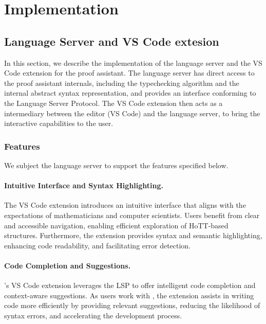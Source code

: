 \chapter{Implementation}
\label{chap:impl}

\section{\Rzk{} Language Server and VS Code extesion}

In this section, we describe the implementation of the language server
and the VS Code extension for the \Rzk{} proof assistant.
The language server has direct access to the proof assistant internals,
including the typechecking algorithm and the internal abstract syntax representation,
and provides an interface conforming to the Language Server Protocol.
The VS Code extension then acts as a intermediary between the editor (VS Code)
and the language server, to bring the interactive capabilities to the user.

\subsection{Features}


We subject the language server to support the features specified below.

\subsubsection{Intuitive Interface and Syntax Highlighting.}

The VS Code extension introduces an intuitive interface that aligns with
the expectations of mathematicians and computer scientists.
Users benefit from clear and accessible navigation,
enabling efficient exploration of HoTT-based structures.
Furthermore, the extension provides syntax and semantic highlighting,
enhancing code readability, and facilitating error detection.

\subsubsection{Code Completion and Suggestions.}

\Rzk{}'s VS Code extension leverages the LSP to offer intelligent code completion
and context-aware suggestions. As users work with \Rzk{}, the extension assists
in writing code more efficiently by providing relevant suggestions, reducing
the likelihood of syntax errors, and accelerating the development process.

